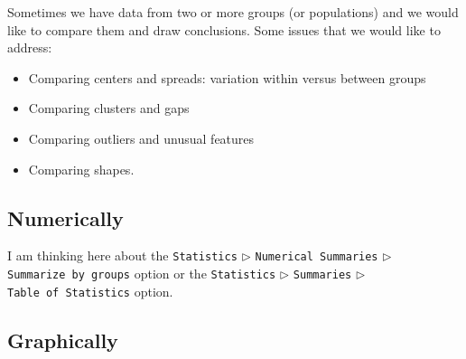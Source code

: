 \documentclass[]{book}
\providecommand{\tightlist}{%
  \setlength{\itemsep}{0pt}\setlength{\parskip}{0pt}}
\numberwithin{equation}{chapter}
\numberwithin{figure}{chapter}
\theoremstyle{plain}
\theoremstyle{definition}
\theoremstyle{remark}
\theoremstyle{definition}
\theoremstyle{definition}
\theoremstyle{remark}
\begin{document}
Sometimes we have data from two or more groups (or populations) and we
would like to compare them and draw conclusions. Some issues that we
would like to address:

\begin{itemize}
\tightlist
\item
  Comparing centers and spreads: variation within versus between groups
\item
  Comparing clusters and gaps
\item
  Comparing outliers and unusual features
\item
  Comparing shapes.
\end{itemize}

\subsection{Numerically}\label{numerically}

I am thinking here about the \texttt{Statistics} \(\triangleright\)
\texttt{Numerical\ Summaries} \(\triangleright\)
\texttt{Summarize\ by\ groups} option or the \texttt{Statistics}
\(\triangleright\) \texttt{Summaries} \(\triangleright\)
\texttt{Table\ of\ Statistics} option.

\subsection{Graphically}\label{graphically}
\end{document}
